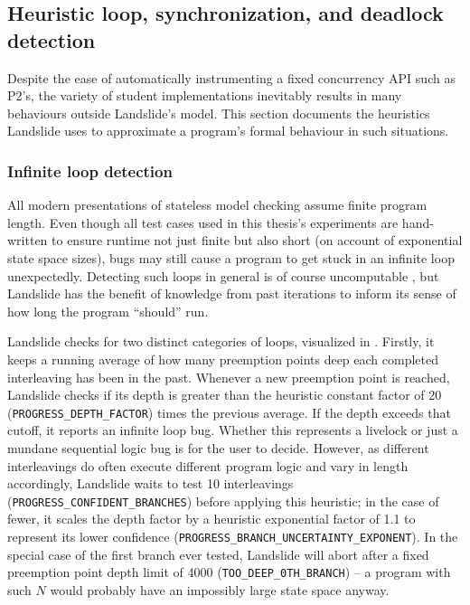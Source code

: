 
\subsection{Heuristic loop, synchronization, and deadlock detection}
\label{sec:landslide-blocking}

Despite the ease of automatically instrumenting a fixed concurrency API such as P2's,
the variety of student implementations inevitably results in many behaviours outside Landslide's model.
This section documents the heuristics Landslide uses to approximate a program's formal behaviour in such situations.

\subsubsection{Infinite loop detection}
\label{sec:landslide-infloop}

All modern presentations of stateless model checking assume finite program length.
Even though all test cases used in this thesis's experiments are hand-written to ensure runtime
not just finite but also short (on account of exponential state space sizes),
bugs may still cause a program to get stuck in an infinite loop unexpectedly.
Detecting such loops in general is of course uncomputable \cite{entscheidungsproblem},
but Landslide has the benefit of knowledge from past iterations to inform its sense of how long the program ``should'' run.

Landslide checks for two distinct categories of  loops,
visualized in .
Firstly, it keeps a running average of how many preemption points deep each completed interleaving has been in the past.
Whenever a new preemption point is reached, Landslide checks
if its depth is greater than the heuristic constant factor of 20
({\tt PROGRESS\_DEPTH\_\allowbreak{}FACTOR})
times the previous average.
If the depth exceeds that cutoff, it reports an infinite loop bug.
Whether this represents a livelock or just a mundane sequential logic bug is for the user to decide.
However, as
different interleavings do
often execute different program logic and vary in length accordingly,
Landslide waits to test 10 interleavings ({\tt PROGRESS\_CONFIDENT\_\allowbreak{}BRANCHES})
before applying this heuristic;
in the case of fewer,
it scales the depth factor by a heuristic exponential factor of 1.1
to represent its lower confidence
({\tt PROGRESS\_BRANCH\_UNCERTAINTY\_EXPONENT}).
In the special case of the first branch ever tested,
Landslide will abort after a fixed preemption point depth limit of 4000 ({\tt TOO\_DEEP\_0TH\_BRANCH})
-- a program with such $N$ would probably have an impossibly large state space anyway.


